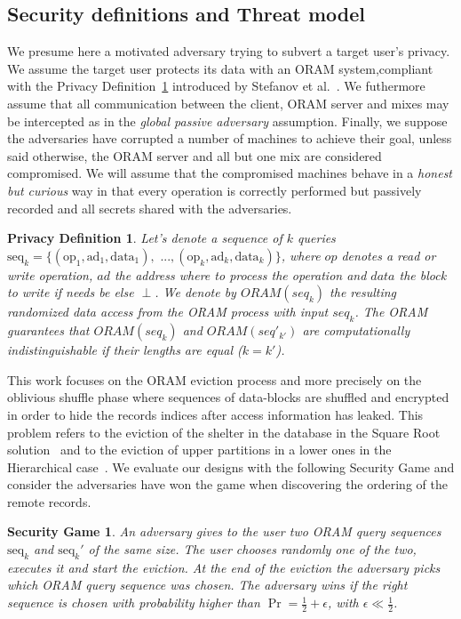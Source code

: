 \documentclass[USenglish,oneside,twocolumn]{article}
\newtheorem{privdef}{Privacy Definition}
\newtheorem*{secgme}{Security Game}
\begin{document}
\subsection{Security definitions and Threat model}\label{Threat}

We presume here a motivated adversary trying to subvert a target user's privacy. We assume the target user protects its data with an ORAM system,compliant with the Privacy Definition~\ref{def:Oram} introduced by Stefanov et al.~\cite{stefanov2011towards}.
We futhermore assume that all communication between the client, ORAM server and mixes may be intercepted as in the \textit{global passive adversary} assumption.
Finally, we suppose the adversaries have corrupted a number of machines to achieve their goal, unless said otherwise, the ORAM server and all but one mix are considered compromised. We will assume that the compromised machines behave in a \textit{honest but curious} way in that every operation is correctly performed but passively recorded and all secrets shared with the adversaries.

\begin{privdef}\label{def:Oram}
Let's denote a sequence of $k$ queries $\text{seq}_k=\{(\text{op}_1, \text{ad}_1, \text{data}_1), \text{ ...},(\text{op}_k, \text{ad}_k, \text{data}_k)\}$, where $op$ denotes a read or write operation, $ad$ the address where to process the operation and $data$ the block to write if needs be else $\perp$.
We denote by $ORAM(seq_k)$ the resulting randomized data access from the ORAM process with input $seq_k$.
The ORAM guarantees that $ORAM(seq_k)$ and $ORAM(seq'_{k'})$ are computationally indistinguishable if their lengths are equal ($k=k'$).
\end{privdef}

This work focuses on the ORAM eviction process and more precisely on the oblivious shuffle phase where sequences of data-blocks are shuffled and encrypted in order to hide the records indices after access information has leaked. This problem refers to the eviction of the shelter in the database in the Square Root solution~\cite{ostrovsky1990efficient} and to the eviction of upper partitions in a lower ones in the Hierarchical case~\cite{goldreich1996software}. We evaluate our designs with the following Security Game and consider the adversaries have won the game when discovering the ordering of the remote records.

%
\begin{secgme}
An adversary gives to the user two ORAM query sequences $\text{seq}_k$ and $\text{seq}_k'$ of the same size. The user chooses randomly one of the two, executes it and start the eviction. At the end of the eviction the adversary picks which ORAM query sequence was chosen. The adversary wins if the right sequence is chosen with probability higher than $\Pr = \frac{1}{2}+\epsilon$, with $\epsilon\ll\frac{1}{2}$.
\label{def:Game}
\end{secgme} 
%
\end{document}
